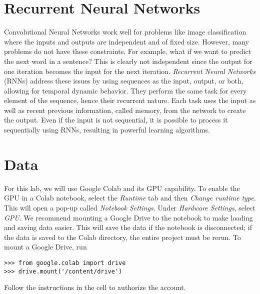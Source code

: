 

\section*{Recurrent Neural Networks}

Convolutional Neural Networks work well for problems like image classification where the inputs and outputs are independent and of fixed size.
However, many problems do not have these constraints.
For example, what if we want to predict the next word in a sentence?
This is clearly not independent since the output for one iteration becomes the input for the next iteration. %
\emph{Recurrent Neural Networks} (RNNs) address these issues by using sequences as the input, output, or both, allowing for temporal dynamic behavior.
They perform the same task for every element of the sequence, hence their recurrent nature.
Each task uses the input as well as recent previous information, called memory, from the network to create the output.
Even if the input is not sequential, it is possible to process it sequentially using RNNs, resulting in powerful learning algorithms.


\section*{Data}

For this lab, we will use Google Colab and its GPU capability.
To enable the GPU in a Colab notebook, select the \emph{Runtime} tab and then \emph{Change runtime type}. 
This will open a pop-up called \emph{Notebook Settings}. Under \emph{Hardware Settings}, select \emph{GPU}.
We recommend mounting a Google Drive to the notebook to make loading and saving data easier.
This will save the data if the notebook is disconnected; if the data is saved to the Colab directory, the entire project must be rerun.
To mount a Google Drive, run 


\begin{lstlisting}
>>> from google.colab import drive
>>> drive.mount('/content/drive')
\end{lstlisting}

Follow the instructions in the cell to authorize the account.

